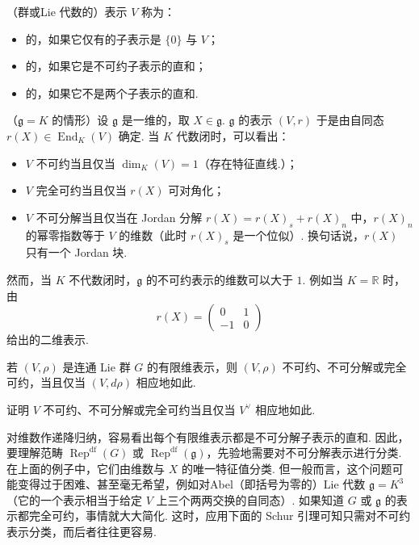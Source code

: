 \begin{numpara}[表示的约化]\label{np:ssl-2-1-6}
（群或Lie 代数的）表示 $V$ 称为：
\begin{itemize}[label=\textendash]
\item {}的，如果它仅有的子表示是 $\{0\}$ 与 $V$；
\item {}的，如果它是不可约子表示的直和；
\item {}的，如果它不是两个子表示的直和.
\end{itemize}
\begin{example*}
（$\mathfrak{g} = K$ 的情形）设 $\mathfrak{g}$ 是一维的，取 $X \in \mathfrak{g}$. $\mathfrak{g}$ 的表示 $(V, r)$ 于是由自同态 $r(X) \in \operatorname{End}_K(V)$ 确定. 当 $K$ 代数闭时，可以看出：
\begin{itemize}[label=\textendash]
\item $V$ 不可约当且仅当 $\dim_K(V) = 1$（存在特征直线.）；
\item $V$ 完全可约当且仅当 $r(X)$ 可对角化；
\item $V$ 不可分解当且仅当在 Jordan 分解 $r(X) = r(X)_s + r(X)_n$ 中，$r(X)_n$ 的幂零指数等于 $V$ 的维数（此时 $r(X)_s$ 是一个位似）. 换句话说，$r(X)$ 只有一个 Jordan 块.
\end{itemize}
然而，当 $K$ 不代数闭时，$\mathfrak{g}$ 的不可约表示的维数可以大于 $1$. 例如当 $K = \mathbb{R}$ 时，由
\[r(X) = \begin{pmatrix} 0 & 1 \\ -1 & 0 \end{pmatrix}\]
给出的二维表示.
\end{example*}
\begin{remark*}
若 $(V, \rho)$ 是连通 Lie 群 $G$ 的有限维表示，则 $(V, \rho)$ 不可约、不可分解或完全可约，当且仅当 $(V, d\rho)$ 相应地如此.
\end{remark*}
\begin{exercise*}
证明 $V$ 不可约、不可分解或完全可约当且仅当 $V^{\vee}$ 相应地如此.
\end{exercise*}
对维数作递降归纳，容易看出每个有限维表示都是不可分解子表示的直和. 因此，要理解范畴 $\operatorname{Rep}^{\mathrm{df}}(G)$ 或 $\operatorname{Rep}^{\mathrm{df}}(\mathfrak{g})$，先验地需要对不可分解表示进行分类. 在上面的例子中，它们由维数与 $X$ 的唯一特征值分类. 但一般而言，这个问题可能变得过于困难、甚至毫无希望，例如对Abel（即括号为零的）Lie 代数 $\mathfrak{g} = K^3$（它的一个表示相当于给定 $V$ 上三个两两交换的自同态）.
如果知道 $G$ 或 $\mathfrak{g}$ 的表示都完全可约，事情就大大简化. 这时，应用下面的 Schur 引理可知只需对不可约表示分类，而后者往往更容易.
\end{numpara}

